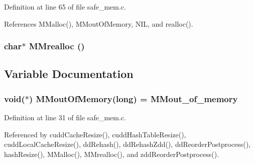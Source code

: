 Definition at line 65 of file safe\_\-mem.c.

References MMalloc(), MMout\-Of\-Memory, NIL, and realloc().
\subsubsection{\setlength{\rightskip}{0pt plus 5cm}char$\ast$ MMrealloc ()}\label{safe__mem_8c_b37d0ce3ce4dfce891c43c8d0d63c0a2}




\subsection{Variable Documentation}
\subsubsection{\setlength{\rightskip}{0pt plus 5cm}void($\ast$) \bf{MMout\-Of\-Memory}(long) = MMout\_\-of\_\-memory}\label{safe__mem_8c_3432ae2ed8816f68fc4d128573eed441}




Definition at line 31 of file safe\_\-mem.c.

Referenced by cudd\-Cache\-Resize(), cudd\-Hash\-Table\-Resize(), cudd\-Local\-Cache\-Resize(), dd\-Rehash(), dd\-Rehash\-Zdd(), dd\-Reorder\-Postprocess(), hash\-Resize(), MMalloc(), MMrealloc(), and zdd\-Reorder\-Postprocess().